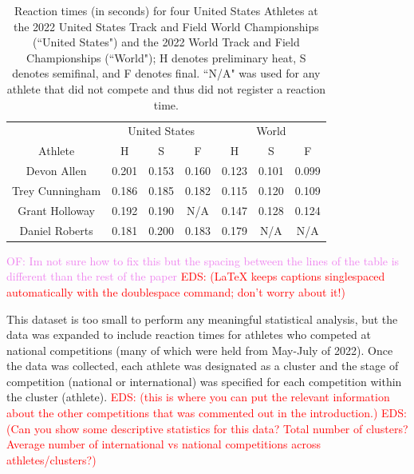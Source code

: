 \documentclass[12pt, letterpaper, titlepage]{article}
\newcommand{\eds}[1]{\textcolor{red}{EDS: (#1)}}
\newcommand{\of}[1]{\textcolor{violet}{OF: #1}}
\begin{document}
\begin{table}
\begin{center}
  \caption{Reaction times (in seconds) for four United States Athletes at the 
	2022 United States Track
  and Field World Championships (``United States") and the 2022 World Track and Field 
	Championships (``World"); H denotes preliminary heat, S denotes semifinal, and 
	F denotes final.
  ``N/A" was used for any athlete that did not compete and thus did not register 
  a reaction time. }
  \begin{tabular}{c c c c c c c} 
   \toprule
	 & \multicolumn{3}{c}{United States} & \multicolumn{3}{c}{World} \\
	\cmidrule(lr){2-4}
    \cmidrule(lr){5-7}
   Athlete &  H &  S &  F &  H &  S &  F \\ [0.5ex] 
   \midrule
   Devon Allen & 0.201 & 0.153 & 0.160 & 0.123 & 0.101 & 0.099 \\ 
   Trey Cunningham & 0.186 & 0.185 & 0.182 & 0.115 & 0.120 & 0.109 \\
   Grant Holloway & 0.192 & 0.190 & N/A & 0.147 & 0.128 & 0.124 \\
   Daniel Roberts & 0.181 & 0.200 & 0.183 & 0.179 & N/A & N/A \\ [0.5ex]
   \bottomrule
  \end{tabular}
  \label{fig:USAvsWorld}
  
  \end{center}
\end{table}

\of{Im not sure how to fix this but the spacing between the lines of the
table is different than the rest of the paper}
\eds{LaTeX keeps captions singlespaced automatically with the doublespace 
command; don't worry about it!} 


This dataset is too small to perform any meaningful statistical analysis, but
the data was expanded to include reaction times for athletes who competed at 
national competitions (many of which were held from May-July of 2022). Once the 
data was collected, each athlete was designated as a cluster and the stage of
competition (national or international) was specified for each competition 
within the cluster (athlete).  \eds{this is where you can put the relevant 
information about the other competitions that was commented out in the 
introduction.}
\eds{Can you show some descriptive statistics for this data?  Total number of 
clusters? Average number of international vs national competitions across 
athletes/clusters?} 
\end{document}
